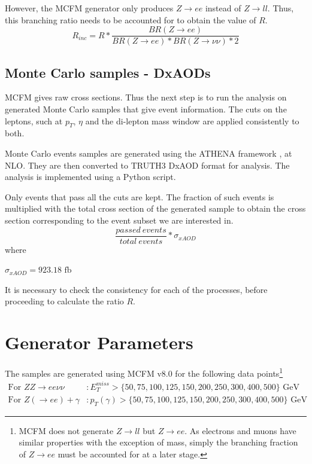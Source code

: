 \documentclass[11pt,a4paper,final]{report}
\begin{document}
However, the MCFM generator only produces $Z\rightarrow ee$ instead of $Z\rightarrow ll$. Thus, this branching ratio needs to be accounted for to obtain the value of $R$.
\begin{equation}\label{eq:R_inc}
	R_{inc} = R * \frac{BR(Z\rightarrow ee)}{BR(Z \rightarrow ee)*BR(Z\rightarrow \nu\nu)*2}
\end{equation}

\subsection*{Monte Carlo samples - DxAODs}
MCFM gives raw cross sections. Thus the next step is to run the analysis on generated Monte Carlo samples that give event information. The cuts on the leptons, such at $p_T$, $\eta$ and the di-lepton mass window are applied consistently to both.

Monte Carlo events samples are generated using the ATHENA framework \cite{ATHENA}, at NLO. They are then converted to TRUTH3 DxAOD format for analysis. The analysis is implemented using a Python script.

Only events that pass all the cuts are kept. The fraction of such events is multiplied with the total cross section of the generated sample to obtain the cross section corresponding to the event subset we are interested in.
\begin{equation}
	\frac{passed\ events}{total\ events}*\sigma_{xAOD}
\end{equation}
where
\begin{center}
\label{eq:xAOD_xsec_frac}
$\sigma_{xAOD} = 923.18 \text{ fb}$
\end{center}

It is necessary to check the consistency for each of the processes, before proceeding to calculate the ratio $R$.

\section{Generator Parameters}
The samples are generated using MCFM v8.0 for the following data points\footnote{MCFM does not generate $Z\rightarrow ll$ but $Z\rightarrow ee$. As electrons and muons have similar properties with the exception of mass, simply the branching fraction of $Z\rightarrow ee$ must be accounted for at a later stage.}
\begin{align*}
	\text{For } ZZ \rightarrow ee\nu\nu &: E_T^{miss} > \{50,75,100,125,150,200,250,300,400,500\}\text{ GeV} \\
	\text{For } Z(\rightarrow ee)+\gamma &: p_T(\gamma) > \{50,75,100,125,150,200,250,300,400,500\}\text{ GeV}
\end{align*}
\end{document}
